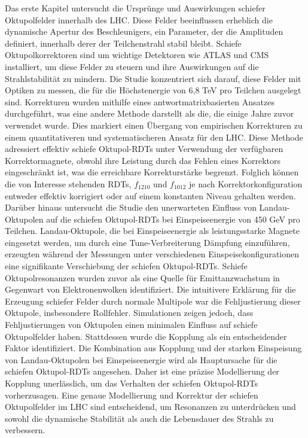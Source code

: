 {%
Das erste Kapitel untersucht die Ursprünge und Auswirkungen schiefer Oktupolfelder innerhalb des LHC. Diese Felder beeinflussen erheblich die dynamische Apertur des Beschleunigers, ein Parameter, der die Amplituden definiert, innerhalb derer der Teilchenstrahl stabil bleibt. Schiefe Oktupolkorrektoren sind um wichtige Detektoren wie ATLAS und CMS installiert, um diese Felder zu steuern und ihre Auswirkungen auf die Strahlstabilität zu mindern. Die Studie konzentriert sich darauf, diese Felder mit Optiken zu messen, die für die Höchstenergie von 6,8 TeV pro Teilchen ausgelegt sind. Korrekturen wurden mithilfe eines antwortmatrixbasierten Ansatzes durchgeführt, was eine andere Methode darstellt als die, die einige Jahre zuvor verwendet wurde. Dies markiert einen Übergang von empirischen Korrekturen zu einem quantitativeren und systematischeren Ansatz für den LHC.
Diese Methode adressiert effektiv schiefe Oktupol-RDTs unter Verwendung der verfügbaren Korrektormagnete, obwohl ihre Leistung durch das Fehlen eines Korrektors eingeschränkt ist, was die erreichbare Korrekturstärke begrenzt. Folglich können die von Interesse stehenden RDTs, $f_{1210}$ und $f_{1012}$ je nach Korrektorkonfiguration entweder effektiv korrigiert oder auf einem konstanten Niveau gehalten werden.
\\
\indent
Darüber hinaus untersucht die Studie den unerwarteten Einfluss von Landau-Oktupolen auf die schiefen Oktupol-RDTs bei Einspeiseenergie von 450 GeV pro Teilchen. Landau-Oktupole, die bei Einspeiseenergie als leistungsstarke Magnete eingesetzt werden, um durch eine Tune-Verbreiterung Dämpfung einzuführen, erzeugten während der Messungen unter verschiedenen Einspeisekonfigurationen eine signifikante Verschiebung der schiefen Oktupol-RDTs. Schiefe Oktupolresonanzen wurden zuvor als eine Quelle für Emittanzwachstum in Gegenwart von Elektronenwolken identifiziert. Die intuitivere Erklärung für die Erzeugung schiefer Felder durch normale Multipole war die Fehljustierung dieser Oktupole, insbesondere Rollfehler. Simulationen zeigen jedoch, dass Fehljustierungen von Oktupolen einen minimalen Einfluss auf schiefe Oktupolfelder haben. Stattdessen wurde die Kopplung als ein entscheidender Faktor identifiziert. Die Kombination aus Kopplung und der starken Einspeisung von Landau-Oktupolen bei Einspeiseenergie wird als Hauptursache für die schiefen Oktupol-RDTs angesehen. Daher ist eine präzise Modellierung der Kopplung unerlässlich, um das Verhalten der schiefen Oktupol-RDTs vorherzusagen. Eine genaue Modellierung und Korrektur der schiefen Oktupolfelder im LHC sind entscheidend, um Resonanzen zu unterdrücken und sowohl die dynamische Stabilität als auch die Lebensdauer des Strahls zu verbessern.

}
